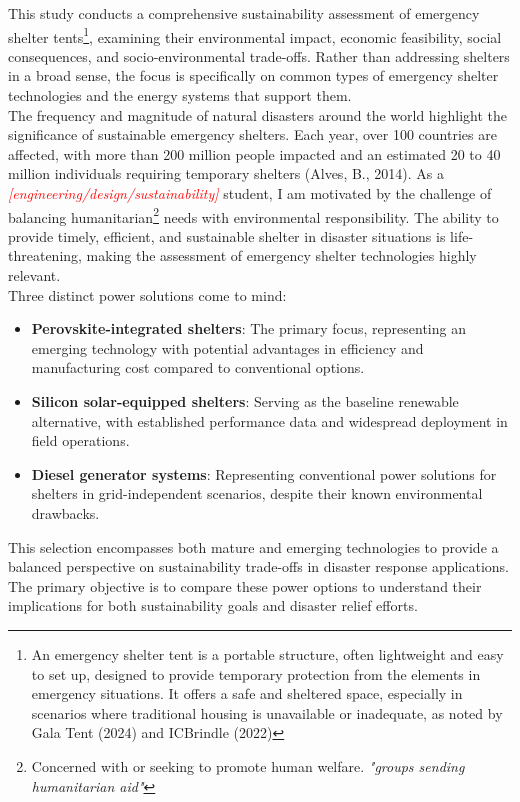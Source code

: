 \documentclass{article}
\begin{document}
This study conducts a comprehensive sustainability assessment of emergency shelter tents\footnote{An emergency shelter tent is a portable structure, often lightweight and easy to set up, designed to provide temporary protection from the elements in emergency situations. It offers a safe and sheltered space, especially in scenarios where traditional housing is unavailable or inadequate, as noted by Gala Tent (2024) and ICBrindle (2022)}, examining their environmental impact, economic feasibility, social consequences, and socio-environmental trade-offs. Rather than addressing shelters in a broad sense, the focus is specifically on common types of emergency shelter technologies and the energy systems that support them.\\[8pt]	
The frequency and magnitude of natural disasters around the world highlight the significance of sustainable emergency shelters. Each year, over 100 countries are affected, with more than 200 million people impacted and an estimated 20 to 40 million individuals requiring temporary shelters (Alves, B., 2014). As a \textcolor{red}{\textit{[engineering/design/sustainability]}} student, I am motivated by the challenge of balancing humanitarian\footnote{Concerned with or seeking to promote human welfare. \textit{"groups sending humanitarian aid"}} needs with environmental responsibility. The ability to provide timely, efficient, and sustainable shelter in disaster situations is life-threatening, making the assessment of emergency shelter technologies highly relevant.\\[8pt]
Three distinct power solutions come to mind:
	\begin{itemize}
		\item \textbf{Perovskite-integrated shelters}: The primary focus, representing an emerging technology with potential advantages in efficiency and manufacturing cost compared to conventional options.
		\item \textbf{Silicon solar-equipped shelters}: Serving as the baseline renewable alternative, with established performance data and widespread deployment in field operations.
		\item \textbf{Diesel generator systems}: Representing conventional power solutions for shelters in grid-independent scenarios, despite their known environmental drawbacks.
	\end{itemize}
This selection encompasses both mature and emerging technologies to provide a balanced perspective on sustainability trade-offs in disaster response applications.\\[8pt]
The primary objective is to compare these power options to understand their implications for both sustainability goals and disaster relief efforts.
\end{document}
